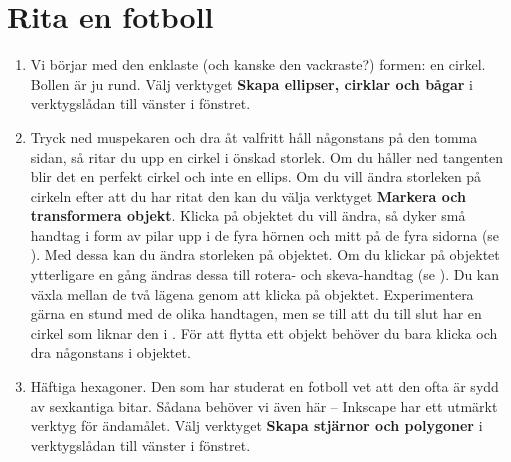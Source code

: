 \documentclass[a4paper,final]{memoir} %
\begin{document}
\section{Rita en fotboll}

\begin{enumerate}

\item Vi börjar med den enklaste (och kanske den vackraste?) formen: en cirkel. Bollen är ju rund. Välj verktyget \textbf{Skapa ellipser, cirklar och bågar} i verktygslådan till vänster i fönstret. 



\item Tryck ned muspekaren och dra åt valfritt håll någonstans på den tomma sidan, så ritar du upp en cirkel i önskad storlek. Om du håller ned tangenten  blir det en perfekt cirkel och inte en ellips. Om du vill ändra storleken på cirkeln efter att du har ritat den kan du välja verktyget \textbf{Markera och transformera objekt}. Klicka på objektet du vill ändra, så dyker små handtag i form av pilar upp i de fyra hörnen och mitt på de fyra sidorna (se ). Med dessa kan du ändra storleken på objektet. Om du klickar på objektet ytterligare en gång ändras dessa till rotera- och skeva-handtag (se ). Du kan växla mellan de två lägena genom att klicka på objektet. Experimentera gärna en stund med de olika handtagen, men se till att du till slut har en cirkel som liknar den i . För att flytta ett objekt behöver du bara klicka och dra någonstans i objektet. 



\item Häftiga hexagoner. Den som har studerat en fotboll vet att den ofta är sydd av sexkantiga bitar. Sådana behöver vi även här -- Inkscape har ett utmärkt verktyg för ändamålet. Välj verktyget \textbf{Skapa stjärnor och polygoner} i verktygslådan till vänster i fönstret.


\end{enumerate}
\end{document}
